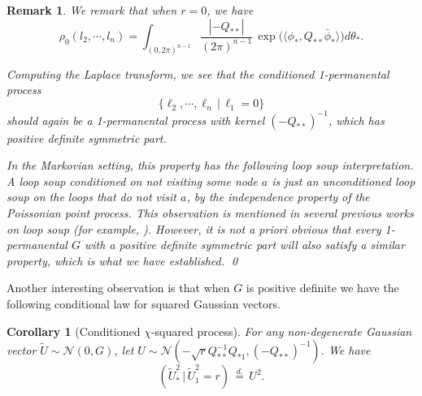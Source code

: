\documentclass[a4paper, 11pt]{article}
\newtheorem{cor}[thm]{Corollary}
\newtheorem{rem}{Remark}[thm]
\begin{document}
\vspace{.3em} \begin{rem} \label{rem:riszero}
We remark that when $r=0$, we have
\[\rho_0(l_2, \cdots, l_n) = \int_{(0,2\pi)^{n-1}}\frac{|-Q_{**}|}{(2\pi)^{n-1}}\,
\exp\big(\langle \phi_*, Q_{**}\bar{\phi}_*\rangle\big)d\theta_*.\]

Computing the Laplace transform, we see that the conditioned 1-permanental process
\[
\{\ell_2,\cdots, \ell_n\,|\, \ell_1=0\}
\]
should again be a 1-permanental process with kernel $(-Q_{**})^{-1}$, which has positive definite symmetric part.

In the Markovian setting, this property has the following loop soup interpretation. A loop soup conditioned on not visiting some node $a$ is just an unconditioned loop soup on the loops that do not visit $a$, by the independence property of the Poissonian point process. This observation is mentioned in several previous works on loop soup (for example, \cite{sznitman12, fr14}). However, it is not a priori obvious that every 1-permanental $G$ with a positive definite symmetric part
will also satisfy a similar property, which is what we have established.
\qed
\end{rem}

Another interesting observation is that when $G$ is positive definite
we have the following conditional law for squared Gaussian vectors.
\vspace{.3em} \begin{cor}[Conditioned $\chi$-squared process]
\label{cor:chi-square}
For any non-degenerate Gaussian vector $\tilde{U}\sim\mathcal{N}(0,G)$, let $U\sim\mathcal{N}(-\sqrt{r}Q_{**}^{-1}Q_{*1},(-Q_{**})^{-1})$. We have
\[(\tilde{U}_*^2\,|\,\tilde{U}_1^2=r)\,\stackrel{d.}{=}\,U^2.\]
\end{cor}
\end{document}

